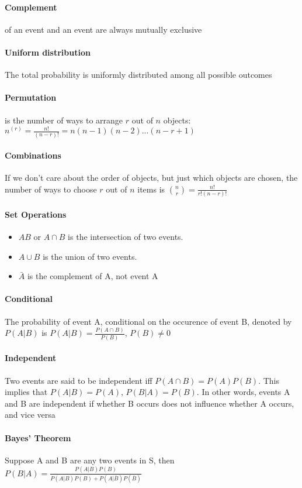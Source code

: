     \paragraph{Complement} of an event and an event are always mutually
    exclusive

    \paragraph{Uniform distribution} The total probability is uniformly
    distributed among all possible outcomes

    \paragraph{Permutation} is the number of ways to arrange $r$ out of $n$
    objects: $ n ^ {(r)} = \frac{n!}{(n-r)!} = n(n-1)(n-2) ... (n-r+1)$

    \paragraph{Combinations} If we don't care about the order of objects, but
    just which objects are chosen, the number of ways to choose $r$ out of $n$
    items is $\binom{n}{r} = \frac{n!}{r!(n-r)!}$

    \paragraph{Set Operations}
    \begin{itemize}
      \item $AB$ or $A\cap B$ is the intersection of two
      events.
      \item$A \cup B$ is the union of two events.
      \item $\bar{A}$ is the complement of A, not event A
    \end{itemize}

    \paragraph{Conditional} The probability of event A, conditional on the
    occurence of event B, denoted by $P(A|B)$ is $P(A|B) = \frac{P(A \cap
    B)}{P(B)}$, $P(B) \neq 0$

    \paragraph{Independent} Two events are said to be independent iff $P(A \cap
    B) = P(A)P(B)$. This implies that $P(A|B) = P(A)$, $P(B|A) = P(B)$. In
    other words, events A and B are independent if whether B occurs does not
    influence whether A occurs, and vice versa

    \paragraph{Bayes' Theorem} Suppose A and B are any two events in S, then
    $P(B|A) = \frac{P(A|B)P(B)}{P(A|B)P(B) + P(A|\bar{B})P(\bar{B})}$
